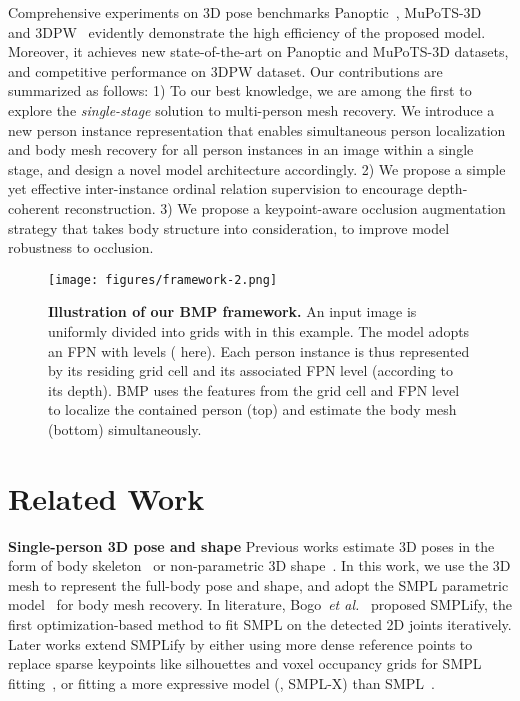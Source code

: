 \documentclass[final]{cvpr}
\newcommand{\et}{\emph{et al.}}
\newcommand{\myparagraph}[1]{{ \noindent \bf #1}}
\begin{document}
Comprehensive experiments on 3D pose benchmarks Panoptic~\cite{joo2015panoptic}, MuPoTS-3D~\cite{singleshotmultiperson2018} and 3DPW~\cite{vonMarcard2018} evidently demonstrate the high efficiency of the proposed model.
Moreover, it achieves new state-of-the-art on Panoptic and MuPoTS-3D datasets, and competitive performance on 3DPW dataset. 
Our contributions are summarized as follows:
1) To our best knowledge, we are among the first to explore the \textit{single-stage} solution to multi-person mesh recovery. We introduce a new person instance representation that enables simultaneous person localization and body mesh recovery for all person instances in an image within a single stage, and design a novel model architecture accordingly.
2) We propose a simple yet effective inter-instance ordinal relation supervision to encourage depth-coherent reconstruction.
3) We propose a keypoint-aware occlusion augmentation strategy that takes body structure into consideration, to improve model robustness to occlusion.


\begin{figure*}[h!]
	\centering
	\texttt{[image: figures/framework-2.png]}
	\caption{\textbf{Illustration of our BMP framework.} 
     An input image is uniformly divided into  grids with  in this example. The model adopts an FPN with  levels ( here). Each person instance is thus   represented by its residing grid cell and its associated FPN level (according to its depth). BMP uses the features from the grid cell and FPN level to localize the contained person (top) and estimate the body mesh (bottom) simultaneously.
    }
    \label{fig:framework}
\end{figure*} \section{Related Work}

\myparagraph{Single-person 3D pose and shape}
Previous works estimate 3D poses in the form of body skeleton~\cite{martinez2017simple,mehta2017vnect,tome2017lifting,zhou2017towards,popa2017deep,pavlakos2018ordinal,sun2018integral,zhang2020inference,gong2021poseaug} or non-parametric 3D shape~\cite{gabeur2019moulding,smith2019facsimile,varol2018bodynet}. 
In this work, we use the 3D mesh to represent the full-body pose and shape, and adopt the SMPL parametric model~\cite{loper2015smpl} for body mesh recovery. 
In literature, Bogo~\et~\cite{bogo2016keep} proposed SMPLify, the first optimization-based method to fit SMPL on the detected 2D joints iteratively. 
Later works extend SMPLify by either using more dense reference points to replace sparse keypoints like silhouettes and voxel occupancy grids for SMPL fitting~\cite{lassner2017unite,varol2018bodynet}, or fitting a more expressive model (\eg, SMPL-X) than SMPL~\cite{pavlakos2019expressive}.
\end{document}
